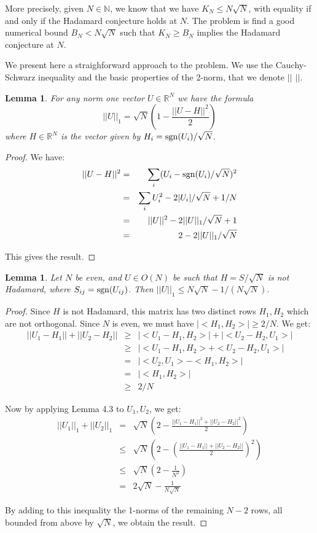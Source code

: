 \documentclass[12pt]{amsart}
\newtheorem{lemma}[theorem]{Lemma}
\begin{document}
More precisely, given $N\in\mathbb N$, we know that we have $K_N\leq N\sqrt{N}$, with equality if and only if the Hadamard conjecture holds at $N$. The problem is find a good numerical bound $B_N<N\sqrt{N}$ such that $K_N\geq B_N$ implies the Hadamard conjecture at $N$.

We present here a straighforward approach to the problem. We use the Cauchy-Schwarz inequality and the basic properties of the 2-norm, that we denote $||\ \,||$.

\begin{lemma}
For any norm one vector $U\in\mathbb R^N$ we have the formula
$$||U||_1=\sqrt{N}\left(1-\frac{||U-H||^2}{2}\right)$$
where $H\in\mathbb R^N$ is the vector given by $H_i={\rm sgn}(U_i)/\sqrt{N}$.  
\end{lemma}

\begin{proof}
We have:
\begin{eqnarray*}
||U-H||^2
&=&\sum_i(U_i-{\rm sgn}(U_i)/\sqrt{N})^2\\
&=&\sum_iU_i^2-2|U_i|/\sqrt{N}+1/N\\
&=&||U||^2-2||U||_1/\sqrt{N}+1\\
&=&2-2||U||_1/\sqrt{N}
\end{eqnarray*}

This gives the result.
\end{proof}

\begin{lemma}
Let $N$ be even, and $U\in O(N)$ be such that $H=S/\sqrt{N}$ is not Hadamard, where $S_{ij}={\rm sgn}(U_{ij})$. Then $||U||_1\leq N\sqrt{N}-1/(N\sqrt{N})$.
\end{lemma}

\begin{proof}
Since $H$ is not Hadamard, this matrix has two distinct rows $H_1,H_2$ which are not orthogonal. Since $N$ is even, we must have $|<H_1,H_2>|\geq 2/N$. We get:
\begin{eqnarray*}
||U_1-H_1||+||U_2-H_2||
&\geq&|<U_1-H_1,H_2>|+|<U_2-H_2,U_1>|\\
&\geq&|<U_1-H_1,H_2>+<U_2-H_2,U_1>|\\
&=&|<U_2,U_1>-<H_1,H_2>|\\
&=&|<H_1,H_2>|\\
&\geq&2/N
\end{eqnarray*}

Now by applying Lemma 4.3 to $U_1,U_2$, we get:
\begin{eqnarray*}
||U_1||_1+||U_2||_1
&=&\sqrt{N}\left(2-\frac{||U_1-H_1||^2+||U_2-H_2||^2}{2}\right)\\
&\leq&\sqrt{N}\left(2-\left(\frac{||U_1-H_1||+||U_2-H_2||}{2}\right)^2\right)\\
&\leq&\sqrt{N}\left(2-\frac{1}{N^2}\right)\\
&=&2\sqrt{N}-\frac{1}{N\sqrt{N}}
\end{eqnarray*}

By adding to this inequality the 1-norms of the remaining $N-2$ rows, all bounded from above by $\sqrt{N}$, we obtain the result.  
\end{proof}
\end{document}
